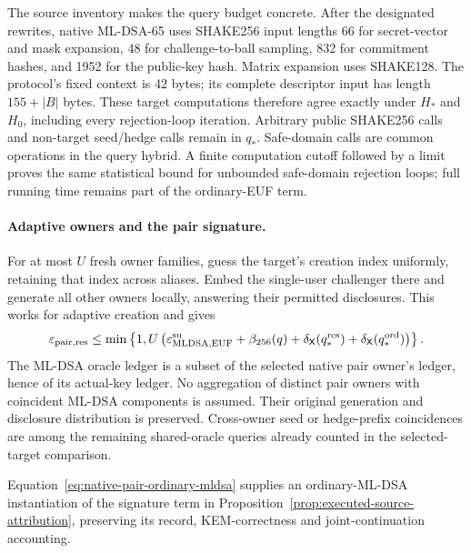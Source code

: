 The source inventory makes the query budget concrete. After the designated
rewrites, native ML-DSA-65 uses SHAKE256 input lengths 66 for secret-vector
and mask expansion, 48 for challenge-to-ball sampling, 832 for commitment
hashes, and 1952 for the public-key hash. Matrix expansion uses SHAKE128.
The protocol's fixed context is 42 bytes; its complete descriptor input
has length $155+|B|$ bytes. These target computations therefore agree
exactly under $H_*$ and $H_0$, including every rejection-loop iteration.
Arbitrary public SHAKE256 calls and non-target seed/hedge calls remain in
$q_*$. Safe-domain calls are common operations in the query hybrid. A
finite computation cutoff followed by a limit proves the same statistical
bound for unbounded safe-domain rejection loops; full running time remains
part of the ordinary-EUF term.

\paragraph{Adaptive owners and the pair signature.}
For at most $U$ fresh owner families, guess the target's creation index
uniformly, retaining that index across aliases. Embed the single-user
challenger there and generate all other owners locally, answering their
permitted disclosures. This works for adaptive creation and gives
\begin{equation}
 \varepsilon_{\rm pair,res}
 \le\min\left\{1,U\left(
       \varepsilon_{\rm MLDSA,EUF}^{\rm su}
       +\beta_{256}(q)
       +\delta_{\mathsf X}(q_*^{\rm res})
       +\delta_{\mathsf X}(q_*^{\rm ord})\right)\right\}.
 \label{eq:native-pair-ordinary-mldsa}
\end{equation}
The ML-DSA oracle ledger is a subset of the selected native pair owner's
ledger, hence of its actual-key ledger. No aggregation of distinct pair
owners with coincident ML-DSA components is assumed. Their original
generation and disclosure distribution is preserved. Cross-owner seed or
hedge-prefix coincidences are among the remaining shared-oracle queries
already counted in the selected-target comparison.

Equation~\eqref{eq:native-pair-ordinary-mldsa} supplies an ordinary-ML-DSA
instantiation of the signature term in
Proposition~\ref{prop:executed-source-attribution}, preserving its record,
KEM-correctness and joint-continuation accounting.

